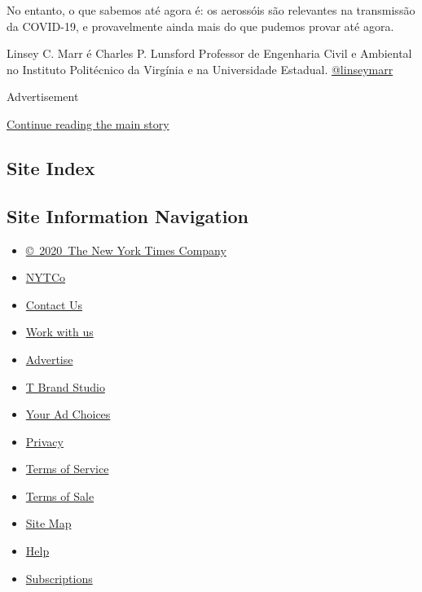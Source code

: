 No entanto, o que sabemos até agora é: os aerossóis são relevantes na
transmissão da COVID-19, e provavelmente ainda mais do que pudemos
provar até agora.

Linsey C. Marr é Charles P. Lunsford Professor de Engenharia Civil e
Ambiental no Instituto Politécnico da Virgínia e na Universidade
Estadual. \href{https://twitter.com/linseymarr}{@linseymarr}

Advertisement

\protect\hyperlink{after-bottom}{Continue reading the main story}

\hypertarget{site-index}{%
\subsection{Site Index}\label{site-index}}

\hypertarget{site-information-navigation}{%
\subsection{Site Information
Navigation}\label{site-information-navigation}}

\begin{itemize}
\tightlist
\item
  \href{https://help.nytimes.com/hc/en-us/articles/115014792127-Copyright-notice}{©~2020~The
  New York Times Company}
\end{itemize}

\begin{itemize}
\tightlist
\item
  \href{https://www.nytco.com/}{NYTCo}
\item
  \href{https://help.nytimes.com/hc/en-us/articles/115015385887-Contact-Us}{Contact
  Us}
\item
  \href{https://www.nytco.com/careers/}{Work with us}
\item
  \href{https://nytmediakit.com/}{Advertise}
\item
  \href{http://www.tbrandstudio.com/}{T Brand Studio}
\item
  \href{https://www.nytimes.com/privacy/cookie-policy\#how-do-i-manage-trackers}{Your
  Ad Choices}
\item
  \href{https://www.nytimes.com/privacy}{Privacy}
\item
  \href{https://help.nytimes.com/hc/en-us/articles/115014893428-Terms-of-service}{Terms
  of Service}
\item
  \href{https://help.nytimes.com/hc/en-us/articles/115014893968-Terms-of-sale}{Terms
  of Sale}
\item
  \href{https://spiderbites.nytimes.com}{Site Map}
\item
  \href{https://help.nytimes.com/hc/en-us}{Help}
\item
  \href{https://www.nytimes.com/subscription?campaignId=37WXW}{Subscriptions}
\end{itemize}
